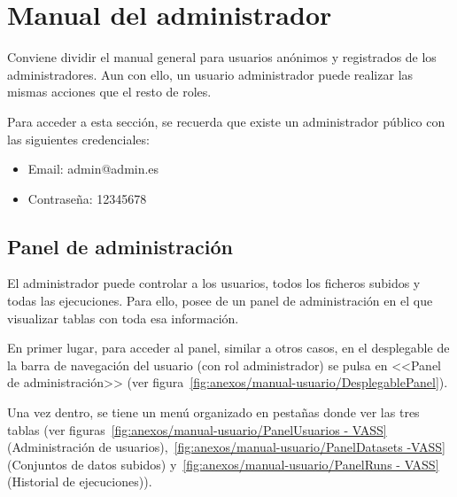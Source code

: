 \section{Manual del administrador}

Conviene dividir el manual general para usuarios anónimos y registrados de los
administradores. Aun con ello, un usuario administrador puede realizar las
mismas acciones que el resto de roles.

Para acceder a esta sección, se recuerda que existe un administrador público con
las siguientes credenciales:
\begin{itemize}
    \item Email: admin@admin.es
    \item Contraseña: 12345678
\end{itemize}

\subsection{Panel de administración}

El administrador puede controlar a los usuarios, todos los ficheros subidos y
todas las ejecuciones. Para ello, posee de un panel de administración en el que
visualizar tablas con toda esa información.

En primer lugar, para acceder al panel, similar a otros casos, en el desplegable
de la barra de navegación del usuario (con rol administrador) se pulsa en
<<Panel de administración>> (ver
figura~\ref{fig:anexos/manual-usuario/DesplegablePanel}).


Una vez dentro, se tiene un menú organizado en pestañas donde ver las tres
tablas (ver figuras~\ref{fig:anexos/manual-usuario/PanelUsuarios - VASS}
(Administración de usuarios),~\ref{fig:anexos/manual-usuario/PanelDatasets -VASS} (Conjuntos de datos subidos) y~\ref{fig:anexos/manual-usuario/PanelRuns -
VASS} (Historial de ejecuciones)).




